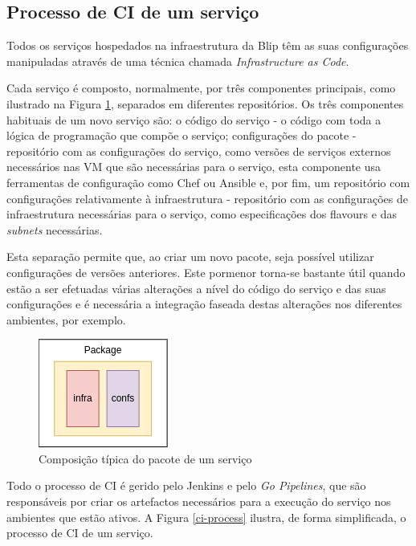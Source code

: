 \subsection{Processo de \ac{CI} de um serviço}

Todos os serviços hospedados na infraestrutura da Blip têm as suas configurações manipuladas
através de uma técnica chamada \textit{Infrastructure as Code}.

Cada serviço é composto, normalmente, por três componentes principais, como ilustrado na Figura
\ref{package}, separados em diferentes repositórios. Os três componentes habituais de um novo 
serviço são: o código do serviço - o código com toda a lógica de programação que compõe o serviço;
configurações do pacote - repositório com as configurações do serviço, como versões de serviços 
externos necessários nas \ac{VM} que são necessárias para o serviço, esta componente usa 
ferramentas de configuração como Chef \cite{chef} ou Ansible \cite{ansible} e, por fim, um 
repositório com configurações relativamente à infraestrutura - repositório com as configurações de 
infraestrutura necessárias para o serviço, como especificações dos \glspl{flavour} e das 
\textit{subnets} necessárias.

Esta separação permite que, ao criar um novo pacote, seja possível utilizar configurações de
versões anteriores. Este pormenor torna-se bastante útil quando estão a ser efetuadas várias
alterações a nível do código do serviço e das suas configurações e é necessária a integração 
faseada destas alterações nos diferentes ambientes, por exemplo.

\begin{figure}[H]
  \centerline{\includegraphics[scale=1.2]{media/content/impl/package.png}}
  \caption{Composição típica do pacote de um serviço}
  \label{package}
\end{figure}

Todo o processo de \ac{CI} é gerido pelo Jenkins e pelo \textit{Go Pipelines}, que são responsáveis
por criar os artefactos necessários para a execução do serviço nos ambientes que estão ativos. 
A Figura \ref{ci-process} ilustra, de forma simplificada, o processo de \ac{CI} de um serviço.

